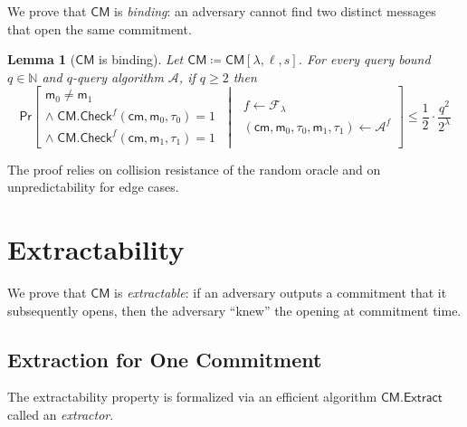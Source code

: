 \documentclass{article}
\newtheorem{lemma}{Lemma}
\newcommand{\Naturals}{\mathbb{N}}
\newcommand{\DefineEqual}{\coloneqq}
\newcommand{\Pr}{\mathsf{Pr}}
\newcommand{\GivenExperiment}{\;\middle|\;}
\newcommand{\StateExperiment}[1]{\begin{array}{l}#1\end{array}}
\newcommand{\ROFunction}{f}
\newcommand{\RODistribution}[1]{\mathcal{F}_{#1}}
\newcommand{\ROOutputSize}{\lambda}
\newcommand{\ROQueryBound}{q}
\newcommand{\ProtoSalt}{\tau}
\newcommand{\ProtoAdversary}{\mathcal{A}}
\newcommand{\CMSymbol}{\mathsf{CM}}
\newcommand{\CMConstructor}[3]{\CMSymbol[#1,#2,#3]}
\newcommand{\CMCheck}{\CMSymbol.\mathsf{Check}}
\newcommand{\CMExtractor}{\CMSymbol.\mathsf{Extract}}
\newcommand{\CMMessageLength}{\ell}
\newcommand{\CMSaltSize}{s}
\newcommand{\CMCommitment}{\mathsf{cm}}
\newcommand{\CMMessage}{\mathsf{m}}
\newcommand{\CMSaltString}{\ProtoSalt}
\newcommand{\CMAdversary}{\ProtoAdversary}
\newcommand{\CMBindingExpression}[2]{\frac{1}{2} \cdot \frac{#2^2}{2^{#1}}}
\begin{document}
We prove that $\CMSymbol$ is \emph{binding}: an adversary cannot find two distinct messages that open the same commitment.

\begin{lemma}[$\CMSymbol$ is binding]
\label{lemma:cm-binding}
Let $\CMSymbol \DefineEqual \CMConstructor{\ROOutputSize}{\CMMessageLength}{\CMSaltSize}$. For every query bound $\ROQueryBound \in \Naturals$ and $\ROQueryBound$-query algorithm $\CMAdversary$, if $\ROQueryBound \geq 2$ then
\begin{equation*}
\Pr\left[
\begin{array}{l}
\CMMessage_{0} \neq \CMMessage_{1} \\
\land\;\CMCheck^{\ROFunction}(\CMCommitment,\CMMessage_{0},\CMSaltString_{0})=1 \\
\land\;\CMCheck^{\ROFunction}(\CMCommitment,\CMMessage_{1},\CMSaltString_{1})=1
\end{array}
\GivenExperiment
\StateExperiment{
\ROFunction \gets \RODistribution{\ROOutputSize} \\
(\CMCommitment,\CMMessage_{0},\CMSaltString_{0},\CMMessage_{1},\CMSaltString_{1}) \gets \CMAdversary^{\ROFunction}
}
\right]
\leq
\CMBindingExpression{\ROOutputSize}{\ROQueryBound}
\end{equation*}
\end{lemma}

The proof relies on collision resistance of the random oracle and on unpredictability for edge cases.

\section{Extractability}
\label{section:basic-commitment-extractability}

We prove that $\CMSymbol$ is \emph{extractable}: if an adversary outputs a commitment that it subsequently opens, then the adversary ``knew'' the opening at commitment time.

\subsection{Extraction for One Commitment}

The extractability property is formalized via an efficient algorithm $\CMExtractor$ called an \emph{extractor}.
\end{document}
